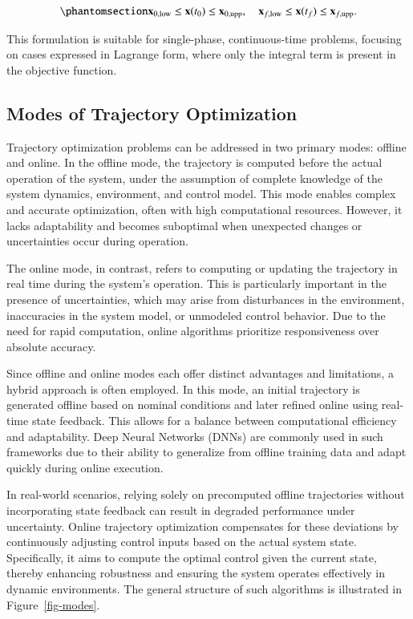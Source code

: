 \documentclass[
  number,
  preprint]{elsarticle}
\begin{document}
\begin{equation}\protect\phantomsection\label{eq-initial-final-bounds}{
\mathbf{x}_{0,\text{low}} \leq \mathbf{x}(t_0) \leq \mathbf{x}_{0,\text{upp}}, \quad 
\mathbf{x}_{f,\text{low}} \leq \mathbf{x}(t_f) \leq \mathbf{x}_{f,\text{upp}}.
}\end{equation}

This formulation is suitable for single-phase, continuous-time problems,
focusing on cases expressed in Lagrange form, where only the integral
term is present in the objective function.

\subsection{Modes of Trajectory
Optimization}\label{modes-of-trajectory-optimization}

Trajectory optimization problems can be addressed in two primary modes:
offline and online. In the offline mode, the trajectory is computed
before the actual operation of the system, under the assumption of
complete knowledge of the system dynamics, environment, and control
model. This mode enables complex and accurate optimization, often with
high computational resources. However, it lacks adaptability and becomes
suboptimal when unexpected changes or uncertainties occur during
operation.

The online mode, in contrast, refers to computing or updating the
trajectory in real time during the system's operation. This is
particularly important in the presence of uncertainties, which may arise
from disturbances in the environment, inaccuracies in the system model,
or unmodeled control behavior. Due to the need for rapid computation,
online algorithms prioritize responsiveness over absolute accuracy.

Since offline and online modes each offer distinct advantages and
limitations, a hybrid approach is often employed. In this mode, an
initial trajectory is generated offline based on nominal conditions and
later refined online using real-time state feedback. This allows for a
balance between computational efficiency and adaptability. Deep Neural
Networks (DNNs) are commonly used in such frameworks due to their
ability to generalize from offline training data and adapt quickly
during online execution.

In real-world scenarios, relying solely on precomputed offline
trajectories without incorporating state feedback can result in degraded
performance under uncertainty. Online trajectory optimization
compensates for these deviations by continuously adjusting control
inputs based on the actual system state. Specifically, it aims to
compute the optimal control given the current state, thereby enhancing
robustness and ensuring the system operates effectively in dynamic
environments. The general structure of such algorithms is illustrated in
Figure~\ref{fig-modes}.
\end{document}
